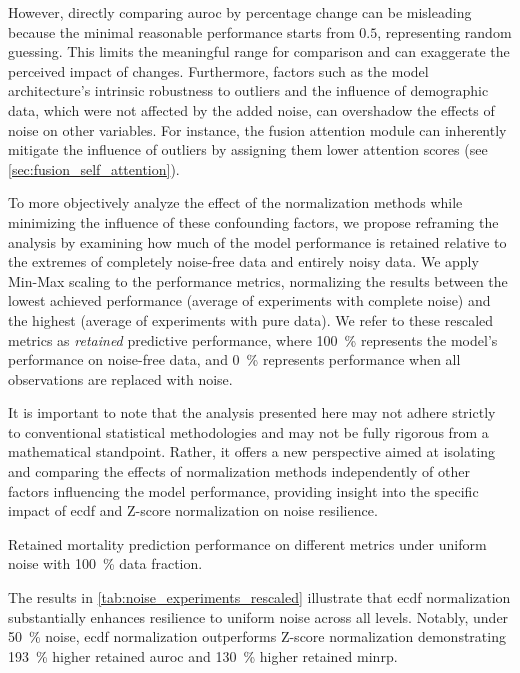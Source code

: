 However, directly comparing \gls{auroc} by percentage change can be misleading because the minimal reasonable performance starts from \(0.5\), representing random guessing. This limits the meaningful range for comparison and can exaggerate the perceived impact of changes. Furthermore, factors such as the model architecture's intrinsic robustness to outliers and the influence of demographic data, which were not affected by the added noise, can overshadow the effects of noise on other variables. For instance, the fusion attention module can inherently mitigate the influence of outliers by assigning them lower attention scores (see \cref{sec:fusion_self_attention}).


To more objectively analyze the effect of the normalization methods while minimizing the influence of these confounding factors, we propose reframing the analysis by examining how much of the model performance is retained relative to the extremes of completely noise-free data and entirely noisy data. We apply Min-Max scaling to the performance metrics, normalizing the results between the lowest achieved performance (average of experiments with complete noise) and the highest (average of experiments with pure data). We refer to these rescaled metrics as \textit{retained} predictive performance, where \qty{100}{\percent} represents the model's performance on noise-free data, and \qty{0}{\percent} represents performance when all observations are replaced with noise.


It is important to note that the analysis presented here may not adhere strictly to conventional statistical methodologies and may not be fully rigorous from a mathematical standpoint. Rather, it offers a new perspective aimed at isolating and comparing the effects of normalization methods independently of other factors influencing the model performance, providing insight into the specific impact of \gls{ecdf} and Z-score normalization on noise resilience.


\begin{table}

\caption{Retained mortality prediction performance on different metrics under uniform noise with \qty{100}{\percent} data fraction.}
\label{tab:noise_experiments_rescaled}
\end{table}

The results in \cref{tab:noise_experiments_rescaled} illustrate that \gls{ecdf} normalization substantially enhances resilience to uniform noise across all levels. Notably, under \qty{50}{\percent} noise, \gls{ecdf} normalization outperforms Z-score normalization demonstrating \qty{193}{\percent} higher retained \gls{auroc} and \qty{130}{\percent} higher retained \gls{minrp}.

